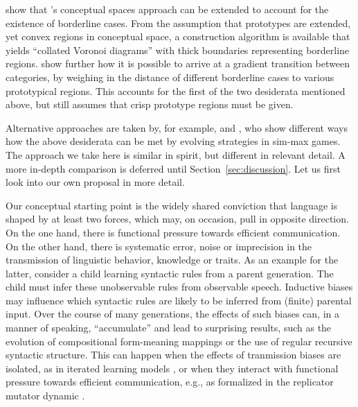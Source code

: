 \documentclass[fleqn,reqno,10pt]{article}
\begin{document}
\citet{DouvenDecock2011:Vagueness:-A-Co} show that
\citeauthor{Gardenfors2000:Conceptual-Spac}'s conceptual spaces
approach can be extended to account for the existence of borderline
cases. From the assumption that prototypes are extended, yet convex
regions in conceptual space, a construction algorithm is available
that yields ``collated Voronoi diagrams'' with thick boundaries
representing borderline
regions. \citet{DecockDouven2012:What-is-Graded-} show further how it
is possible to arrive at a gradient transition between categories, by
weighing in the distance of different borderline cases to various
prototypical regions. This accounts for the first of the two
desiderata mentioned above, but still assumes that crisp prototype
regions must be given.

Alternative approaches are taken by, for example, \citet{FrankeJager2010:Vagueness-Signa} and
\citet{OConnor2013:The-Evolution-o}, who show different ways how the above desiderata can be met by evolving
strategies in sim-max games. The approach we take here is similar in spirit, but different in
relevant detail. A more in-depth comparison is deferred until Section~\ref{sec:discussion}. Let
us first look into our own proposal in more detail.

Our conceptual starting point is the widely shared conviction that language is shaped by at
least two forces, which may, on occasion, pull in opposite direction. On the one hand, there is
functional pressure towards efficient communication. On the other hand, there is systematic
error, noise or imprecision in the transmission of linguistic behavior, knowledge or traits. As
an example for the latter, consider a child learning syntactic rules from a parent
generation. The child must infer these unobservable rules from observable speech. Inductive
biases may influence which syntactic rules are likely to be inferred from (finite) parental
input. Over the course of many generations, the effects of such biases can, in a manner of
speaking, ``accumulate'' and lead to surprising results, such as the evolution of compositional
form-meaning mappings or the use of regular recursive syntactic structure. This can happen when
the effects of tranmission biases are isolated, as in iterated learning models
\citep{KirbyHurford2002:The-Emergence-o,SmithKirby2003:Iterated-Learni,GriffithsKalish2007:Language-Evolut,KirbyGriffith2014:Iterated-Learni},
or when they interact with functional pressure towards efficient communication, e.g., as
formalized in the replicator mutator dynamic
\citep[e.g.][]{NowakPlotkin2000:The-Evolution-o,NowakKomarova2001:Evolution-of-Un}.
\end{document}
